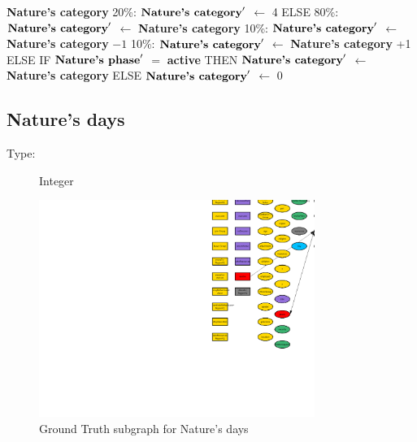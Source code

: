 \documentclass{article}%
\begin{document}
\begin{flushleft}
\textbf{Nature's category}%
\linebreak%
\hspace*{10em}%
20\%: %
$\mbox{\textbf{Nature's category}} '$%
$\leftarrow$%
4%
\linebreak%
\hspace*{8em}%
ELSE %
\linebreak%
\hspace*{10em}%
80\%: %
$\mbox{\textbf{Nature's category}} '$%
$\leftarrow$%
\textbf{Nature's category}%
\linebreak%
\hspace*{10em}%
10\%: %
$\mbox{\textbf{Nature's category}} '$%
$\leftarrow$%
\textbf{Nature's category}%
${-}1$%
\linebreak%
\hspace*{10em}%
10\%: %
$\mbox{\textbf{Nature's category}} '$%
$\leftarrow$%
\textbf{Nature's category}%
+1%
\linebreak%
\hspace*{2em}%
ELSE %
IF %
$\mbox{\textbf{Nature's phase}} '$%
$=$%
\textbf{active}%
\linebreak%
\hspace*{4em}%
THEN %
$\mbox{\textbf{Nature's category}} '$%
$\leftarrow$%
\textbf{Nature's category}%
\linebreak%
\hspace*{4em}%
ELSE %
$\mbox{\textbf{Nature's category}} '$%
$\leftarrow$%
0%
\end{flushleft}

%
\subsection{Nature's days}%
\label{subsec:Nature's days}%
\begin{description}%
\item[Type:]%
Integer%
\end{description}%


\begin{figure}[ht]%
\centering%
\includegraphics[width=0.8\textwidth]{images/daysOfNature.png}%
\caption{Ground Truth subgraph for Nature's days}%
\end{figure}
\end{document}
